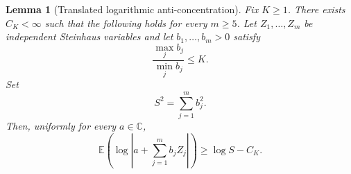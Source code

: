 \documentclass[11pt]{article}
\newtheorem{lemma}[theorem]{Lemma}
\theoremstyle{definition}
\newcommand{\C}{\mathbb C}
\newcommand{\1}{\mathbf 1}
\begin{document}
\begin{lemma}[Translated logarithmic anti-concentration]\label{lem:Steinhaus}
Fix $K\ge1$.  There exists $C_K<\infty$ such that the following holds for every $m\ge5$.  Let $Z_1,\ldots,Z_m$ be independent Steinhaus variables and let $b_1,\ldots,b_m>0$ satisfy
\begin{equation}\label{eq:comparable-b}
\frac{\max_jb_j}{\min_jb_j}\le K.
\end{equation}
Set
\begin{equation}\label{eq:S-def}
S^2=\sum_{j=1}^m b_j^2.
\end{equation}
Then, uniformly for every $a\in\C$,
\begin{equation}\label{eq:translated-log-main}
\mathbb E\left(\log\left|a+\sum_{j=1}^m b_jZ_j\right|\right)
\ge
\log S-C_K.
\end{equation}
\end{lemma}
\end{document}
